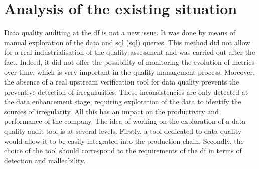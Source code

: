 \section{Analysis of the existing situation}
Data quality auditing at the \acrlong{df} is not a new issue. It was done by means of manual exploration of the data and \acrshort{sql} (\acrlong{sql}) queries. This method did not allow for a real industrialisation of the quality assessment and was carried out after the fact. Indeed, it did not offer the possibility of monitoring the evolution of metrics over time, which is very important in the quality management process. Moreover, the absence of a real upstream verification tool for data quality prevents the preventive detection of irregularities. These inconsistencies are only detected at the data enhancement stage, requiring exploration of the data to identify the sources of irregularity. All this has an impact on the productivity and performance of the company. The idea of working on the exploration of a data quality audit tool is at several levels. Firstly, a tool dedicated to data quality would allow it to be easily integrated into the production chain. Secondly, the choice of the tool should correspond to the requirements of the \acrshort{df} in terms of detection and malleability.

